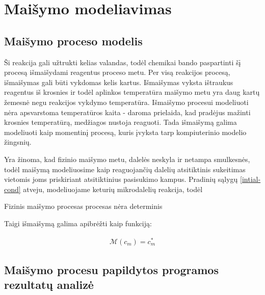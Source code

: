 
\section{Maišymo modeliavimas}
\subsection{Maišymo proceso modelis}

Ši reakcija gali užtrukti kelias valandas, todėl chemikai bando paspartinti šį procesą išmaišydami reagentus proceso metu. Per visą reakcijos procesą, išmaišymas gali būti vykdomas kelis kartus. Išmaišymas vyksta ištraukus reagentus iš krosnies ir todėl aplinkos temperatūra maišymo metu yra daug kartų žemesnė negu reakcijos vykdymo temperatūra. Išmaišymo procesui modeliuoti nėra apsvarstoma temperatūros kaita - daroma prielaida, kad pradėjus mažinti krosnies temperatūrą, medžiagos nustoja reaguoti. Tada išmaišymą galima modeliuoti kaip momentinį procesą, kuris įvyksta tarp kompiuterinio modelio žingsnių. 

Yra žinoma, kad fizinio maišymo metu, dalelės neskyla ir netampa smulkesnės, todėl maišymą modeliuosime kaip reaguojančių dalelių atsitiktinis sukeitimas vietomis joms priskiriant atsitiktinius pasisukimo kampus. Pradinių sąlygų \eqref{intial-cond} atveju, modeliuojame keturių mikrodalelių reakcija, todėl

Fizinis maišymo procesas procesas nėra determinis



Taigi išmaišymą galima apibrėžti kaip funkciją:

\begin{align}
    \mathcal{M}(c_m) = c_m^*
\end{align}




\subsection{Maišymo procesu papildytos programos rezultatų analizė}

